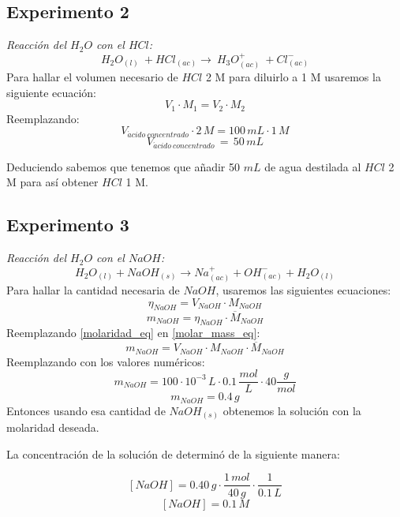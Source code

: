 \documentclass[../main.tex]{subfiles}
\begin{document}
\subsection{Experimento 2}

\textit{Reacción del $H_2O$ con el $HCl$:}
\[H_2O_{(l)} \: + HCl_{(ac)} \rightarrow \: H_3O^+_{(ac)} \: + Cl^-_{(ac)} \]
Para hallar el volumen necesario de $HCl$ 2 M para diluirlo a 1 M
usaremos la siguiente ecuación:
\[
    V_1\cdot M_1 = V_2\cdot M_2
\]
Reemplazando:
\[V_{\acute{a}cido\:concentrado}\cdot 2\,M = 100\,mL\cdot1\,M\]
\[V_{\acute{a}cido\:concentrado}\,=\,50\,mL \]

Deduciendo sabemos que tenemos que añadir 50 $mL$ de agua
destilada al $HCl$ 2 M para así obtener $HCl$ 1 M. 

\subsection{Experimento 3}

\textit{Reacción del $H_2O$ con el $NaOH$:}
\[
    H_2O_{(l)} + NaOH_{(s)} \rightarrow Na^+_{(ac)} + OH^-_{(ac)} + H_2O_{(l)}
\]
Para hallar la cantidad necesaria de $NaOH$, usaremos las siguientes ecuaciones:
\begin{equation} \label{molaridad_eq}
    \eta_{NaOH} = V_{NaOH}\cdot M_{NaOH}
\end{equation}
\begin{equation} \label{molar_mass_eq}
    m_{NaOH} = \eta_{NaOH}\cdot \overline{M}_{NaOH}
\end{equation}
Reemplazando \ref{molaridad_eq} en \ref{molar_mass_eq}:
\begin{equation} \label{resultant_eq}
    m_{NaOH} = V_{NaOH}\cdot M_{NaOH}\cdot \overline{M}_{NaOH}
\end{equation}
Reemplazando con los valores numéricos:
\[
    m_{NaOH} = 100\cdot10^{-3}\,L\cdot0.1\,\frac{mol}{L}\cdot 40\frac{g}{mol}
\]
\[  m_{NaOH} = 0.4\,g\]
Entonces usando esa cantidad de $NaOH_{(s)}$ obtenemos la solución con la molaridad deseada.

La concentración de la solución de determinó de la siguiente manera:

\[ [NaOH] = 0.40\,g\cdot \frac{1\,mol}{40\,g}\cdot\frac{1}{0.1\,L}\]
\[ [NaOH] = 0.1\,M\]
\end{document}
